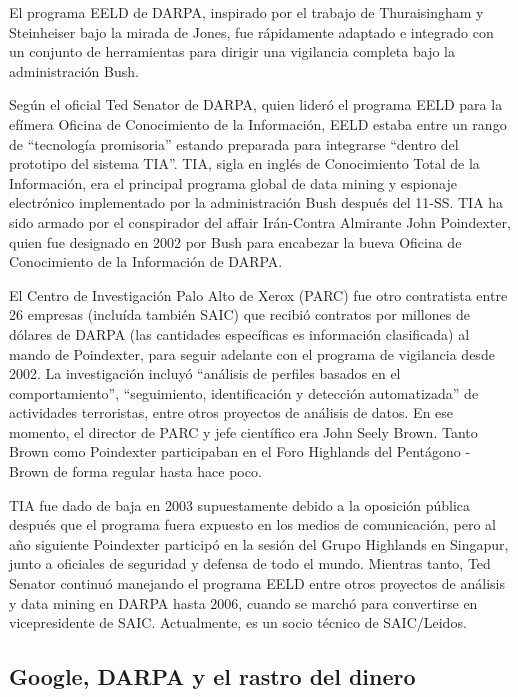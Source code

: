 \documentclass[10pt,a5paper,twoside,spanish,]{book}
\begin{document}
El programa EELD de DARPA, inspirado por el trabajo de Thuraisingham y
Steinheiser bajo la mirada de Jones, fue rápidamente adaptado e
integrado con un conjunto de herramientas para dirigir una vigilancia
completa bajo la administración Bush.

Según el oficial Ted Senator de DARPA, quien lideró el programa EELD
para la efímera Oficina de Conocimiento de la Información, EELD estaba
entre un rango de ``tecnología promisoria'' estando preparada para
integrarse ``dentro del prototipo del sistema TIA''. TIA, sigla en
inglés de Conocimiento Total de la Información, era el principal
programa global de data mining y espionaje electrónico implementado por
la administración Bush después del 11-SS. TIA ha sido armado por el
conspirador del affair Irán-Contra Almirante John Poindexter, quien fue
designado en 2002 por Bush para encabezar la bueva Oficina de
Conocimiento de la Información de DARPA.

El Centro de Investigación Palo Alto de Xerox (PARC) fue otro
contratista entre 26 empresas (incluída también SAIC) que recibió
contratos por millones de dólares de DARPA (las cantidades específicas
es información clasificada) al mando de Poindexter, para seguir adelante
con el programa de vigilancia desde 2002. La investigación incluyó
``análisis de perfiles basados en el comportamiento'', ``seguimiento,
identificación y detección automatizada'' de actividades terroristas,
entre otros proyectos de análisis de datos. En ese momento, el director
de PARC y jefe científico era John Seely Brown. Tanto Brown como
Poindexter participaban en el Foro Highlands del Pentágono - Brown de
forma regular hasta hace poco.

TIA fue dado de baja en 2003 supuestamente debido a la oposición pública
después que el programa fuera expuesto en los medios de comunicación,
pero al año siguiente Poindexter participó en la sesión del Grupo
Highlands en Singapur, junto a oficiales de seguridad y defensa de todo
el mundo. Mientras tanto, Ted Senator continuó manejando el programa
EELD entre otros proyectos de análisis y data mining en DARPA hasta
2006, cuando se marchó para convertirse en vicepresidente de SAIC.
Actualmente, es un socio técnico de SAIC/Leidos.

\subsection{Google, DARPA y el rastro del
dinero}\label{google-darpa-y-el-rastro-del-dinero}
\end{document}
